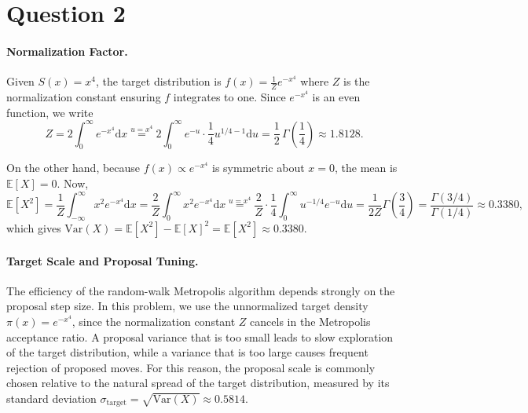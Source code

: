\documentclass[a4paper,10pt]{article}
\theoremstyle{nonumberplain}
\theoremstyle{nonumberplain}
\theoremstyle{nonumberplain}
\theoremstyle{nonumberplain}
\begin{document}
\section{Question 2}

\paragraph{Normalization Factor.}

Given $S(x) = x^4$, the target distribution is $f(x) = \frac{1}{Z}e^{-x^4}$ where $Z$ is the normalization constant ensuring $f$ integrates to one. Since $e^{-x^4}$ is an even function, we write
\[
Z = 2\int_0^\infty e^{-x^4}\mathrm{d}x \overset{u=x^4}{=}
2\int_0^\infty e^{-u}\cdot \frac14 u^{1/4-1}\mathrm{d}u = 
\frac12\,\Gamma\!\left(\frac14\right)
\approx 1.8128.
\]

On the other hand, because $f(x) \propto e^{-x^4}$ is symmetric about $x = 0$, the mean is $\mathbb{E}[X] = 0$. Now, \[\mathbb E[X^2] = \frac1Z\int_{-\infty}^{\infty} x^2 e^{-x^4}\mathrm{d}x =
\frac{2}{Z}\int_0^\infty x^2 e^{-x^4}\mathrm{d}x \overset{u=x^4}{=} \frac{2}{Z}\cdot\frac14
\int_0^\infty u^{-1/4}e^{-u}\mathrm{d}u = \dfrac{1}{2Z}\Gamma\left({\frac34}\right) = \frac{\Gamma(3/4)}{\Gamma(1/4)}
\approx 0.3380, 
\]
which gives $\mathrm{Var}(X) = \mathbb{E}[X^2] - \mathbb{E}[X]^2 = \mathbb{E}[X^2] \approx 0.3380.$ 



\paragraph{Target Scale and Proposal Tuning.}

The efficiency of the random-walk Metropolis algorithm \cite{metropolis1953} depends strongly on the proposal step size. In this problem, we use the unnormalized target density $\pi(x) = e^{-x^4}$, since the normalization constant $Z$ cancels in the Metropolis acceptance ratio. A proposal variance that is too small leads to slow exploration of the target distribution, while a variance that is too large causes frequent rejection of proposed moves. For this reason, the proposal scale is commonly chosen relative to the natural spread of the target distribution, measured by its standard deviation $\sigma_{\text{target}} = \sqrt{\mathrm{Var}(X)} \approx 0.5814.$
\end{document}
